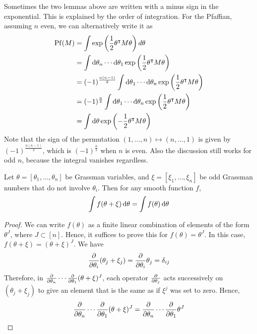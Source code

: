 \begin{remark}
	Sometimes the two lemmas above are written with a minus sign in the
	exponential. This is explained by the order of integration. For the
	Pfaffian, assuming $n$ even, we can alternatively write it as 
	\begin{align*}
		\Pf(M)
		&= \int \exp\paren{\frac{1}{2}\theta^{\intercal}M\theta} d\theta \\
		&= \int \odif{\theta_n}\cdots \odif{\theta_1} 
		\exp\paren{\frac{1}{2}\theta^{\intercal}M\theta} \\
		&= (-1)^{\frac{n(n-1)}{2}}\int \odif{\theta_1}\cdots \odif{\theta_n} 
		\exp\paren{\frac{1}{2}\theta^{\intercal}M\theta} \\
		&= (-1)^{\frac{n}{2}}\int \odif{\theta_1}\cdots \odif{\theta_n} 
		\exp\paren{\frac{1}{2}\theta^{\intercal}M\theta} \\
		&= \int \odif{\theta} 
		\exp\paren{-\frac{1}{2}\theta^{\intercal}M\theta} 
	\end{align*}
	Note that the sign of the permutation $(1,\ldots,n)\mapsto(n,\ldots,1)$ is
	given by $(-1)^{\frac{n(n-1)}{2}}$, which is $(-1)^{\frac{n}{2}}$ when $n$ is even.
	Also the discussion still works for odd $n$, because the integral vanishes
	regardless.
\end{remark}

\begin{prop} 
	\label{prop:berezin_translation}
	Let $\theta = [\theta_1,\ldots,\theta_n]$ be Grassman variables, and $\xi =
	[\xi_1,\ldots,\xi_n]$ be odd Grassman numbers that do not involve
	$\theta_i$. Then for any smooth function $f$, 
	\[
	\int f(\theta + \xi) \odif{\theta} = \int f(\theta) \odif{\theta}
	\] 
\end{prop}
\begin{proof}
	We can write $f(\theta)$ as a finite linear combination of elements of the
	form $\theta^J$, where  $J \subset [n]$. 
	Hence, it suffices to prove this for $f(\theta) =\theta^J$. 
	In this case, $f(\theta+\xi) = (\theta+\xi)^{J}$. 
	We have 
	\[
	\pdv{}{\theta_i}(\theta_j+\xi_j) = \pdv{}{\theta_i} \theta_j = \delta_{ij}
	\] 
	Therefore, in	
	$\pdv{}{\theta_n}\cdots\pdv{}{\theta_1}(\theta+\xi)^J$, each operator
	$\pdv{}{\theta_j}$ acts successively on $(\theta_j+\xi_j)$ to give an 
	element that is the same as if $\xi^j$ was set to zero. Hence, 
	 \[
	\pdv{}{\theta_n}\cdots\pdv{}{\theta_1}(\theta+\xi)^J = 
	\pdv{}{\theta_n}\cdots\pdv{}{\theta_1}\theta^J
	 \] 
\end{proof}

